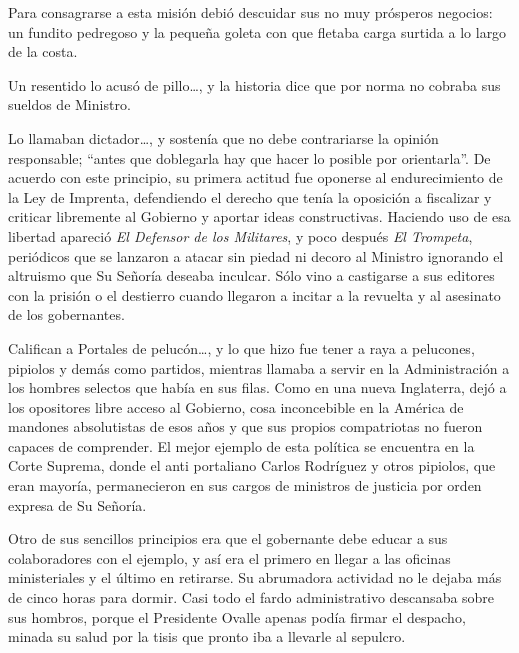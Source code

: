 \documentclass[10pt,twoside,openright]{memoir}
\begin{document}
Para consagrarse a esta misión debió descuidar sus no muy prósperos
negocios: un fundito pedregoso y la pequeña goleta con que fletaba carga
surtida a lo largo de la costa.

Un resentido lo acusó de pillo\ldots, y la historia dice que por norma no
cobraba sus sueldos de Ministro.

Lo llamaban dictador\ldots, y sostenía que no debe contrariarse la opinión
responsable; ``antes que doblegarla hay que hacer lo posible por
orientarla''. De acuerdo con este principio, su primera actitud fue
oponerse al endurecimiento de la Ley de Imprenta, defendiendo el derecho
que tenía la oposición a fiscalizar y criticar libremente al Gobierno y
aportar ideas constructivas. Haciendo uso de esa libertad apareció \emph{El
Defensor de los Militares}, y poco después
\emph{El Trompeta}, periódicos que se
lanzaron a atacar sin piedad ni decoro al Ministro ignorando el
altruismo que Su Señoría deseaba inculcar. Sólo vino a castigarse a sus
editores con la prisión o el destierro cuando llegaron a incitar a la
revuelta y al asesinato de los gobernantes.

Califican a Portales de pelucón\ldots, y lo que hizo fue tener a raya a
pelucones, pipiolos y demás como partidos, mientras llamaba a servir en
la Administración a los hombres selectos que había en sus filas. Como en
una nueva Inglaterra, dejó a los opositores libre acceso al Gobierno,
cosa inconcebible en la América de
mandones absolutistas de esos años y que sus propios compatriotas no
fueron capaces de comprender. El mejor ejemplo de esta política se
encuentra en la Corte Suprema, donde el anti portaliano Carlos Rodríguez
y otros pipiolos, que eran mayoría, permanecieron en sus cargos de
ministros de justicia por orden expresa de Su Señoría.

Otro de sus sencillos principios era que el gobernante debe educar a sus
colaboradores con el ejemplo, y así era el primero en llegar a las
oficinas ministeriales y el último en retirarse. Su abrumadora actividad
no le dejaba más de cinco horas para dormir. Casi todo el fardo
administrativo descansaba sobre sus hombros, porque el Presidente Ovalle
apenas podía firmar el despacho, minada su salud por la tisis que pronto
iba a llevarle al sepulcro.
\end{document}
